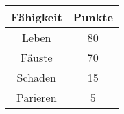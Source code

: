 \begin{tabular}{cc}
  \toprule
  Fähigkeit & Punkte \\
  \midrule
  Leben & 80 \\
  Fäuste & 70 \\
  Schaden & 15 \\
  Parieren & 5 \\
  \bottomrule
\end{tabular}
